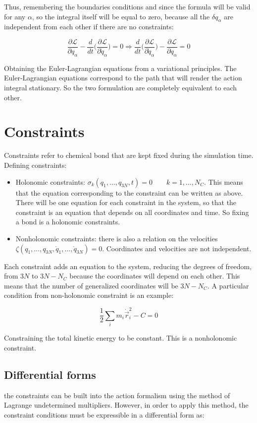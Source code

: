 	Thus, remembering the boundaries conditions and since the formula will be valid for any $\alpha$, so the integral itself will be equal to zero, because all the $\delta q_\alpha$ are independent from each other if there are no constraints:

	$$\frac{\partial\mathcal{L}}{\partial q_\alpha} - \frac{d}{dt}\biggl(\frac{\partial\mathcal{L}}{\partial\dot{q}_\alpha}\biggr) = 0\Rightarrow \frac{d}{dt}\biggl(\frac{\partial\mathcal{L}}{\partial\dot{q}_\alpha}\biggr)-\frac{\partial\mathcal{L}}{\partial q_\alpha} = 0$$

	Obtaining the Euler-Lagrangian equations from a variational principles.
	The Euler-Lagrangian equations correspond to the path that will render the action integral stationary.
	So the two formulation are completely equivalent to each other.

\section{Constraints}
Constraints refer to chemical bond that are kept fixed during the simulation time.
Defining constraints:

\begin{itemize}
	\item Holonomic constraints: $\sigma_k(q_1, \dots, q_{3N}, t) = 0\qquad k = 1, \dots, N_C$.
		This means that the equation corresponding to the constraint can be written as above.
		There will be one equation for each constraint in the system, so that the constraint is an equation that depends on all coordinates and time.
		So fixing a bond is a holonomic constraints.
	\item Nonholonomic constraints: there is also a relation on the velocities $\zeta(q_1, \dots, q_{3N}, \dot{q}_1, \dots, \dot{q}_{3N}) = 0$.
		Coordinates and velocities are not independent.
\end{itemize}

Each constraint adds an equation to the system, reducing the degrees of freedom, from $3N$ to $3N-N_C$ because the coordinates will depend on each other.
This means that the number of generalized coordinates will be $3N-N_C$.
A particular condition from non-holonomic constraint is an example:

$$\frac{1}{2}\sum\limits_{i}m_i\dot{\vec{r}}_i^2-C = 0$$

Constraining the total kinetic energy to be constant.
This is a nonholonomic constraint.

	\subsection{Differential forms}
	the constraints can be built into the action formalism using the method of Lagrange undetermined multipliers. However, in order to apply this method, the constraint conditions must be expressible in a differential form as:

